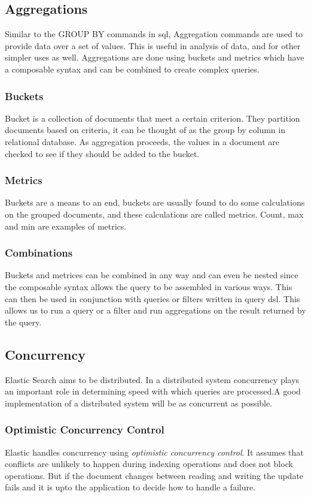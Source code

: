 \documentclass[12pt]{article}
\begin{document}
 		\subsection{Aggregations}
				Similar to the GROUP BY commands in \ac{sql}, Aggregation commands are used to provide data over a set of values. This is useful in analysis of data, and for other simpler uses as well. Aggregations are done using buckets and metrics which have a composable syntax and can be combined to create complex queries.

			\subsubsection{Buckets}
				Bucket is a collection of documents that meet a certain criterion.\cite{book} They partition documents based on criteria, it can be thought of as the group by column in relational database. As aggregation proceeds, the values in a document are checked to see if they should be added to the bucket.

			\subsubsection{Metrics}
				Buckets are a means to an end, buckets are usually found to do some calculations on the grouped documents, and these calculations are called metrics. Count, max and min are examples of metrics.

			\subsubsection{Combinations}
				Buckets and metrices can be combined in any way and can even be nested since the composable syntax allows the query to be assembled in various ways. This can then be used in conjunction with queries or filters written in query \ac{dsl}. This allows us to run a query or a filter and run aggregations on the result returned by the query.

		\subsection{Concurrency}
			Elastic Search aims to be distributed. In a distributed system concurrency plays an important role in determining speed with which queries are processed.A good implementation of a distributed system will be as concurrent as possible. 

			\subsubsection{Optimistic Concurrency Control}
				Elastic handles concurrency using \emph{optimistic concurrency control}. It assumes that conflicts are unlikely to happen during indexing operations and does not block operations\cite{book}. But if the document changes between reading and writing the update fails and it is upto the application to decide how to handle a failure. 
\end{document}
